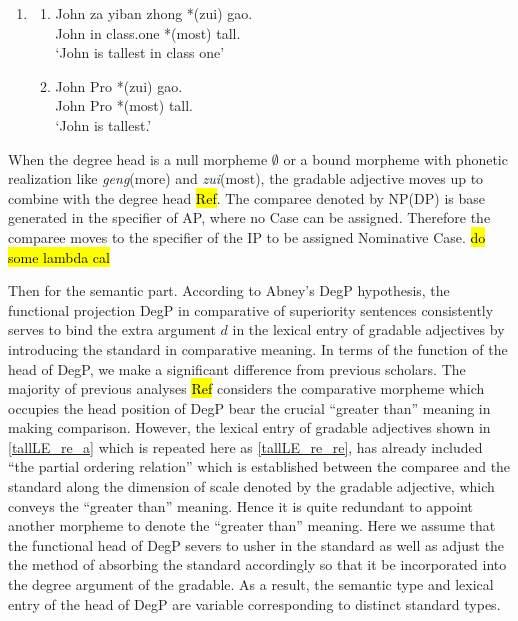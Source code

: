 \documentclass{ctexart}
\begin{document}
\begin{enumerate}
    \item \label{superiority_example_4}
    \begin{enumerate}
        \item \label{superiority_example_4_a}
        John za yiban zhong *(zui) gao. \\
        John in class.one *(most) tall. \\
        `John is tallest in class one'

        \item \label{superiority_example_4_b}
        John Pro *(zui) gao. \\
        John Pro *(most) tall.  \\
        `John is tallest.'

    \end{enumerate}
\end{enumerate}

When the degree head is a null morpheme $\emptyset$ or a bound morpheme with phonetic realization like \textit{geng}(more) and \textit{zui}(most), the gradable adjective moves up to combine with the degree head \hl{Ref}. The comparee denoted by NP(DP) is base generated in the specifier of AP, where no Case can be assigned. Therefore the comparee moves to the specifier of the IP to be assigned Nominative Case. \hl{do some lambda cal}

Then for the semantic part. According to Abney's DegP hypothesis, the functional projection DegP in comparative of superiority sentences consistently serves to bind the extra argument $d$ in the lexical entry of gradable adjectives by introducing the standard in comparative meaning. In terms of the function of the head of DegP, we make a significant  difference from previous scholars. The majority of previous analyses \hl{Ref} considers the comparative morpheme which occupies the head position of DegP bear the crucial ``greater than'' meaning in making comparison. However, the lexical entry of gradable adjectives shown in \ref{tallLE_re_a} which is repeated here as \ref{tallLE_re_re}, has already included ``the partial ordering relation'' which is established between the comparee and the standard along the dimension of scale denoted by the gradable adjective, which conveys the ``greater than'' meaning. Hence it is quite redundant to appoint another morpheme to denote the ``greater than'' meaning.  Here we assume that the functional head of DegP severs to usher in the standard as well as adjust the the method of absorbing the standard accordingly so that it be incorporated into the degree argument of the gradable. As a result, the semantic type and lexical entry of the head of DegP are variable corresponding to distinct standard types.
\end{document}
